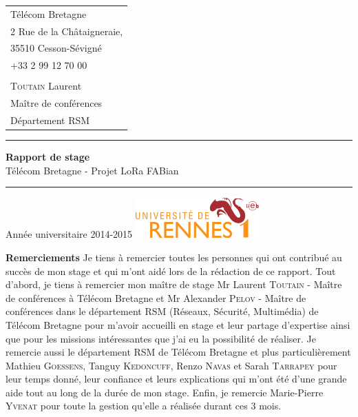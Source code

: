 \documentclass{article}
\begin{document}
\begin{titlepage}
\begin{tabular}{l}
		Télécom Bretagne\\
		2 Rue de la Châtaigneraie,\\
		35510 Cesson-Sévigné\\
		+33 2 99 12 70 00\\
		\\
		\textsc{Toutain} Laurent\\
		Maître de conférences\\
		Département RSM
	\end{tabular}
	\vfill
	\begin{center}
		\vspace{0.5cm}\hrule\vspace{0.5cm}
		\LARGE{\textbf{Rapport de stage}}\\
		\Large{Télécom Bretagne - Projet LoRa FABian}
		\vspace{0.5cm}\hrule
	\end{center}
	\vfill
	\begin{flushleft}
		\Large{Année universitaire 2014-2015}
		\hspace{4cm}
		\includegraphics[scale=0.6]{univ}
	\end{flushleft}
\end{titlepage}
\begin{titlepage}
\textbf{Remerciements}
\newline\newline
Je tiens à remercier toutes les personnes qui ont contribué au succès de mon stage et qui m'ont aidé lors de la rédaction de ce rapport.
\newline\newline
Tout d'abord, je tiens à remercier mon maître de stage Mr Laurent \textsc{Toutain} - Maître de conférences à Télécom Bretagne et Mr Alexander \textsc{Pelov} - Maître de conférences dans le département RSM (Réseaux, Sécurité, Multimédia) de Télécom Bretagne pour m'avoir accueilli en stage et leur partage d'expertise ainsi que pour les missions intéressantes que j'ai eu la possibilité de réaliser.
\newline\newline
Je remercie aussi le département RSM de Télécom Bretagne et plus particulièrement Mathieu \textsc{Goessens}, Tanguy \textsc{Kedoncuff}, Renzo \textsc{Navas} et Sarah \textsc{Tarrapey} pour leur temps donné, leur confiance et leurs explications qui m'ont été d'une grande aide tout au long de la durée de mon stage.
\newline\newline
Enfin, je remercie Marie-Pierre \textsc{Yvenat} pour toute la gestion qu'elle a réalisée durant ces 3 mois.
\end{titlepage}
\end{document}
